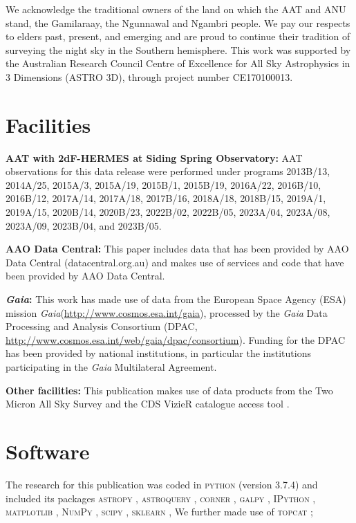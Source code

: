 \documentclass[
  journal=pasa,
  manuscript=research-paper, %
  year=2023,
  volume=37
]{cup-journal}
\newcommand{\Gaia}{\textit{Gaia}\xspace}
\begin{document}
We acknowledge the traditional owners of the land on which the AAT and ANU stand, the Gamilaraay, the Ngunnawal and Ngambri people. We pay our respects to elders past, present, and emerging and are proud to continue their tradition of surveying the night sky in the Southern hemisphere.
This work was supported by the Australian Research Council Centre of Excellence for All Sky Astrophysics in 3 Dimensions (ASTRO 3D), through project number CE170100013.

\section*{Facilities}

\textbf{AAT with 2dF-HERMES at Siding Spring Observatory:}
AAT observations for this data release were performed under programs {2013B/13}, {2014A/25}, {2015A/3}, {2015A/19}, {2015B/1}, {2015B/19}, {2016A/22}, {2016B/10}, {2016B/12}, {2017A/14}, {2017A/18}, {2017B/16}, {2018A/18}, {2018B/15}, {2019A/1}, {2019A/15}, {2020B/14}, {2020B/23}, {2022B/02}, {2022B/05}, {2023A/04}, {2023A/08}, {2023A/09}, {2023B/04}, and {2023B/05}.

\textbf{AAO Data Central:} This paper includes data that has been provided by AAO Data Central  (datacentral.org.au) and makes use of services and code that have been provided by AAO Data Central.

\textbf{\Gaia: } This work has made use of data from the European Space Agency (ESA) mission \Gaia (\url{http://www.cosmos.esa.int/gaia}), processed by the \Gaia Data Processing and Analysis Consortium (DPAC, \url{http://www.cosmos.esa.int/web/gaia/dpac/consortium}). Funding for the DPAC has been provided by national institutions, in particular the institutions participating in the \Gaia Multilateral Agreement. 

\textbf{Other facilities:} This publication makes use of data products from the Two Micron All Sky Survey \citep{Skrutskie2006} and the CDS VizieR catalogue access tool \citep{Vizier2000}.

\section*{Software}

The research for this publication was coded in \textsc{python} (version 3.7.4) and included its packages
\textsc{astropy} \citep[v. 3.2.2;][]{Robitaille2013,PriceWhelan2018},
\textsc{astroquery} \citep[v. 0.4;][]{Ginsburg2019},
\textsc{corner} \citep[v. 2.0.1;][]{corner},
\textsc{galpy} \citep[version 1.6.0;][]{Bovy2015},
\textsc{IPython} \citep[v. 7.8.0;][]{ipython},
\textsc{matplotlib} \citep[v. 3.1.3;][]{matplotlib},
\textsc{NumPy} \citep[v. 1.17.2;][]{numpy},
\textsc{scipy} \citep[version 1.3.1;][]{scipy},
\textsc{sklearn} \citep[v. 0.21.3;][]{scikit-learn},
We further made use of \textsc{topcat} \citep[version 4.7;][]{Taylor2005};
\end{document}
